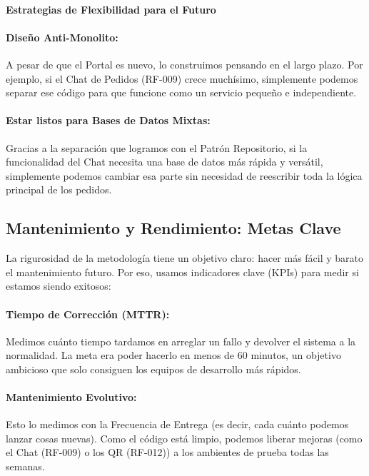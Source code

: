 \paragraph{Estrategias de Flexibilidad para el Futuro}

\paragraph{Diseño Anti-Monolito:} A pesar de que el Portal es nuevo, lo construimos pensando en el largo plazo. Por ejemplo, si el Chat de Pedidos (RF-009) crece muchísimo, simplemente podemos separar ese código para que funcione como un servicio pequeño e independiente.

\paragraph{Estar listos para Bases de Datos Mixtas:} Gracias a la separación que logramos con el Patrón Repositorio, si la funcionalidad del Chat necesita una base de datos más rápida y versátil, simplemente podemos cambiar esa parte sin necesidad de reescribir toda la lógica principal de los pedidos.

\subsection{Mantenimiento y Rendimiento: Metas Clave}

La rigurosidad de la metodología tiene un objetivo claro: hacer más fácil y barato el mantenimiento futuro. Por eso, usamos indicadores clave (KPIs) para medir si estamos siendo exitosos:

\paragraph{Tiempo de Corrección (MTTR):} Medimos cuánto tiempo tardamos en arreglar un fallo y devolver el sistema a la normalidad. La meta era poder hacerlo en menos de 60 minutos, un objetivo ambicioso que solo consiguen los equipos de desarrollo más rápidos.

\paragraph{Mantenimiento Evolutivo:} Esto lo medimos con la Frecuencia de Entrega (es decir, cada cuánto podemos lanzar cosas nuevas). Como el código está limpio, podemos liberar mejoras (como el Chat (RF-009) o los QR (RF-012)) a los ambientes de prueba todas las semanas.

